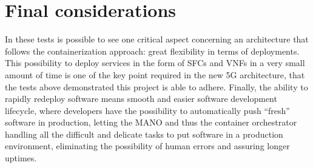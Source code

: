 \section{Final considerations}

In these tests is possible to see one critical aspect concerning an architecture
that follows the containerization approach: great flexibility in terms of
deployments. This possibility to deploy services in the form of SFCs and VNFs in
a very small amount of time is one of the key point required in the new 5G
architecture, that the tests above demonstrated this project is able to adhere.
Finally, the ability to rapidly redeploy software means smooth and easier
software development lifecycle, where developers have the possibility to
automatically push ``fresh'' software in production, letting the MANO and thus
the container orchestrator handling all the difficult and delicate tasks to put
software in a production environment, eliminating the possibility of human
errors and assuring longer uptimes.

